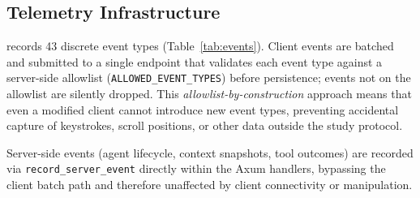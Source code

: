 \subsection{Telemetry Infrastructure}
\label{sec:system:telemetry}

\Weld records 43 discrete event types (Table~\ref{tab:events}). Client events
are batched and submitted to a single endpoint that validates each event type
against a server-side allowlist (\texttt{ALLOWED\_EVENT\_TYPES}) before
persistence; events not on the allowlist are silently dropped. This
\emph{allowlist-by-construction} approach means that even a modified client
cannot introduce new event types, preventing accidental capture of keystrokes,
scroll positions, or other data outside the study protocol.

Server-side events (agent lifecycle, context snapshots, tool outcomes) are
recorded via \texttt{record\_server\_event} directly within the Axum handlers,
bypassing the client batch path and therefore unaffected by client connectivity
or manipulation.

